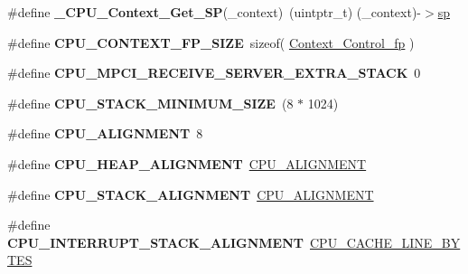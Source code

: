 \begin{DoxyCompactItemize}
\#define {\bfseries \+\_\+\+C\+P\+U\+\_\+\+Context\+\_\+\+Get\+\_\+\+SP}(\+\_\+context)~(uintptr\+\_\+t) (\+\_\+context)-\/$>$\mbox{\hyperlink{group__mips__regs_ga8d40798874dab99986478ef00ff3e297}{sp}}
\item 
\mbox{\label{group__RTEMSScoreCPUMIPS_gaf58e4ff1f7e1c85fc5c0b80cbd0672c5}} 
\#define {\bfseries C\+P\+U\+\_\+\+C\+O\+N\+T\+E\+X\+T\+\_\+\+F\+P\+\_\+\+S\+I\+ZE}~sizeof( \mbox{\hyperlink{structContext__Control__fp}{Context\+\_\+\+Control\+\_\+fp}} )
\item 
\mbox{\label{group__RTEMSScoreCPUMIPS_gab94869be93a41da88a10fa59771ce2c9}} 
\#define {\bfseries C\+P\+U\+\_\+\+M\+P\+C\+I\+\_\+\+R\+E\+C\+E\+I\+V\+E\+\_\+\+S\+E\+R\+V\+E\+R\+\_\+\+E\+X\+T\+R\+A\+\_\+\+S\+T\+A\+CK}~0
\item 
\mbox{\label{group__RTEMSScoreCPUMIPS_ga4c92ceea7549cc7b21db2c466916b733}} 
\#define {\bfseries C\+P\+U\+\_\+\+S\+T\+A\+C\+K\+\_\+\+M\+I\+N\+I\+M\+U\+M\+\_\+\+S\+I\+ZE}~(8 $\ast$ 1024)
\item 
\mbox{\label{group__RTEMSScoreCPUMIPS_gae526a309e32001688261048b19cdb7d8}} 
\#define {\bfseries C\+P\+U\+\_\+\+A\+L\+I\+G\+N\+M\+E\+NT}~8
\item 
\mbox{\label{group__RTEMSScoreCPUMIPS_gac71c1e0159c32144a04f18646ede252b}} 
\#define {\bfseries C\+P\+U\+\_\+\+H\+E\+A\+P\+\_\+\+A\+L\+I\+G\+N\+M\+E\+NT}~\mbox{\hyperlink{v850_2include_2rtems_2score_2cpu_8h_ae526a309e32001688261048b19cdb7d8}{C\+P\+U\+\_\+\+A\+L\+I\+G\+N\+M\+E\+NT}}
\item 
\mbox{\label{group__RTEMSScoreCPUMIPS_ga8aed43eb1b3c346772c127482b4b5372}} 
\#define {\bfseries C\+P\+U\+\_\+\+S\+T\+A\+C\+K\+\_\+\+A\+L\+I\+G\+N\+M\+E\+NT}~\mbox{\hyperlink{v850_2include_2rtems_2score_2cpu_8h_ae526a309e32001688261048b19cdb7d8}{C\+P\+U\+\_\+\+A\+L\+I\+G\+N\+M\+E\+NT}}
\item 
\mbox{\label{group__RTEMSScoreCPUMIPS_ga6a578627686e1020a28f5a295703ca74}} 
\#define {\bfseries C\+P\+U\+\_\+\+I\+N\+T\+E\+R\+R\+U\+P\+T\+\_\+\+S\+T\+A\+C\+K\+\_\+\+A\+L\+I\+G\+N\+M\+E\+NT}~\mbox{\hyperlink{no__cpu_2include_2rtems_2score_2cpu_8h_aafa1399e268a9ae6adf6d6aad4371688}{C\+P\+U\+\_\+\+C\+A\+C\+H\+E\+\_\+\+L\+I\+N\+E\+\_\+\+B\+Y\+T\+ES}}

\end{DoxyCompactItemize}
